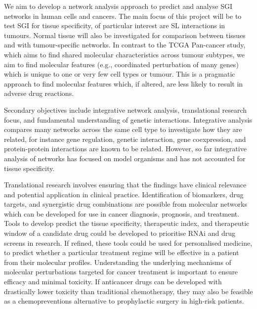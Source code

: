 \iffalse
We aim to develop a network analysis approach to predict and analyse \gls{SGI} networks in human cells and cancers. The main focus of this project will be to test \gls{SGI} for tissue specificity, of particular interest are SL interactions in \glspl{tumour}. Normal tissue will also be investigated for comparison between tissues and with tumour-specific networks. In contrast to the \gls{TCGA} Pan-cancer study, which aims to find shared molecular characteristics across tumour subtypes, we aim to find molecular features (e.g., coordinated perturbation of many genes) which is unique to one or very few cell types or tumour. This is a pragmatic approach to find molecular features which, if altered, are less likely to result in adverse drug reactions.

Secondary objectives include integrative network analysis, translational research focus, and fundamental understanding of genetic interactions. Integrative analysis compares many networks across the same cell type to investigate how they are related, for instance gene regulation, genetic interaction, gene coexpression, and protein-protein interactions are known to be related. However, so far integrative analysis of networks has focused on model organisms and has not accounted for tissue specificity.

Translational research involves ensuring that the findings have clinical relevance and potential application in clinical practice. Identification of biomarkers, drug targets, and synergistic drug combinations are possible from molecular networks which can be developed for use in cancer diagnosis, prognosis, and treatment. Tools to develop predict the tissue specificity, therapeutic index, and therapeutic window of a candidate drug could be developed to prioritise \gls{RNAi} and drug screens in research. If refined, these tools could be used for personalised medicine, to predict whether a particular treatment regime will be effective in a patient from their \glspl{molecular profile}. Understanding the underlying mechanisms of molecular perturbations targeted for cancer treatment is important to ensure efficacy and minimal toxicity. If anticancer drugs can be developed with drastically lower toxicity than traditional \gls{chemotherapy}, they may also be feasible as a \glspl{chemoprevention} alternative to prophylactic surgery in high-risk patients.

